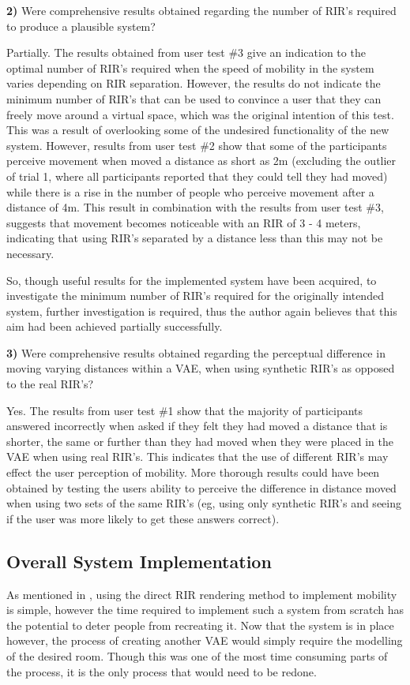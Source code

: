 \documentclass[../../main.tex]{subfiles}
\begin{document}
			\textbf{2)} Were comprehensive results obtained regarding the number of \ac{RIR}'s required to produce a plausible system?


				Partially. The results obtained from user test \#3 give an indication to the optimal number of \ac{RIR}'s required when the speed of mobility in the system varies depending on \ac{RIR} separation. However, the results do not indicate the minimum number of \ac{RIR}'s that can be used to convince a user that they can freely move around a virtual space, which was the original intention of this test. This was a result of overlooking some of the undesired functionality of the new system. However, results from user test \#2 show that some of the participants perceive movement when moved a distance as short as 2m (excluding the outlier of trial 1, where all participants reported that they could tell they had moved) while there is a rise in the number of people who perceive movement after a distance of 4m. This result in combination with the results from user test \#3, suggests that movement becomes noticeable with an \ac{RIR} of 3 - 4 meters, indicating that using \ac{RIR}'s separated by a distance less than this may not be necessary.

				So, though useful results for the implemented system have been acquired, to investigate the minimum number of \ac{RIR}'s required for the originally intended system, further investigation is required, thus the author again believes that this aim had been achieved partially successfully.


			\textbf{3)} Were comprehensive results obtained regarding the perceptual difference in moving varying distances within a \ac{VAE}, when using synthetic \ac{RIR}'s as opposed to the real \ac{RIR}'s?

				Yes. The results from user test \#1 show that the majority of participants answered incorrectly when asked if they felt they had moved a distance that is shorter, the same or further than they had moved when they were placed in the \ac{VAE} when using real \ac{RIR}'s. This indicates that the use of different \ac{RIR}'s may effect the user perception of mobility. More thorough results could have been obtained by testing the users ability to perceive the difference in distance moved when using two sets of the same \ac{RIR}'s (eg, using only synthetic \ac{RIR}'s and seeing if the user was more likely to get these answers correct).



		\subsection{Overall System Implementation}
			 As mentioned in , using the direct \ac{RIR} rendering method to implement mobility is simple, however the time required to implement such a system from scratch has the potential to deter people from recreating it. Now that the system is in place however, the process of creating another \ac{VAE} would simply require the modelling of the desired room. Though this was one of the most time consuming parts of the process, it is the only process that would need to be redone.
\end{document}
